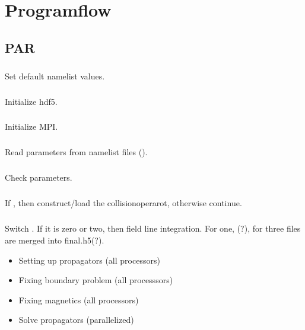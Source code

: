 \chapter{Programflow}

\section{PAR}

\paragraph{}
Set default namelist values.

\paragraph{}
Initialize hdf5.

\paragraph{}
Initialize MPI.

\paragraph{}
Read parameters from namelist files ().

\paragraph{}
Check parameters.

\paragraph{}
If , then construct/load the
collisionoperarot, otherwise continue.

\paragraph{}
Switch .
If it is zero or two, then field line integration. For one,
(?), for three files are merged into final.h5(?).
\begin{itemize}
  \item Setting up propagators (all processors)
  \item Fixing boundary problem (all processsors)
  \item Fixing magnetics (all processors)
  \item Solve propagators (parallelized)
\end{itemize}

